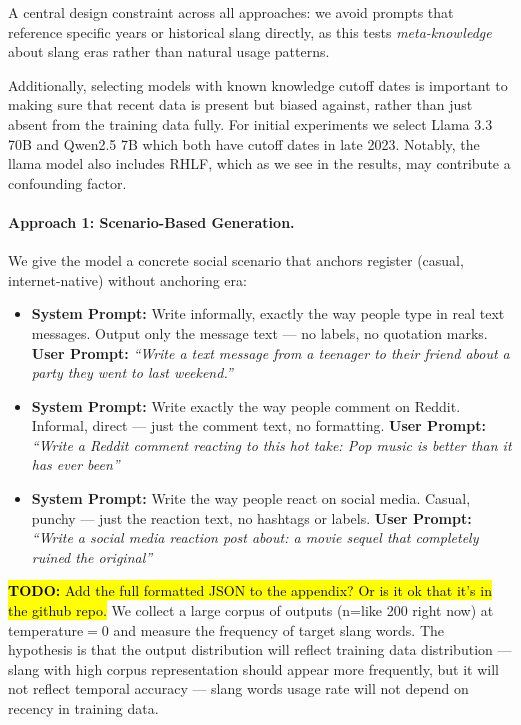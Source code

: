 \documentclass[11pt]{article}
\newcommand{\todo}[1]{\hl{\textbf{TODO:} #1}}
\begin{document}
A central design constraint across all approaches: we avoid prompts that reference specific years or historical slang directly, as this tests \textit{meta-knowledge} about slang eras rather than natural usage patterns.

Additionally, selecting models with known knowledge cutoff dates is important to making sure that recent data is present but biased against, rather than just absent from the training data fully. For initial experiments we select Llama 3.3 70B  
and Qwen2.5 7B which both have cutoff dates in late 2023. Notably, the llama model also includes RHLF, which as we see in the results, may contribute a confounding factor.

\paragraph{Approach 1: Scenario-Based Generation.}
We give the model a concrete social scenario that anchors register (casual, internet-native) without anchoring era:
\begin{itemize}
   \item \textbf{System Prompt:} Write informally, exactly the way people type in real text messages. Output only the message text — no labels, no quotation marks.
  \subitem \textbf{User Prompt:} \textit{``Write a text message from a teenager to their friend about a party they went to last weekend.''}
  \item \textbf{System Prompt:} Write exactly the way people comment on Reddit. Informal, direct — just the comment text, no formatting.
  \subitem \textbf{User Prompt:} \textit{``Write a Reddit comment reacting to this hot take: Pop music is better than it has ever been''}
  \item \textbf{System Prompt:} Write the way people react on social media. Casual, punchy — just the reaction text, no hashtags or labels.
  \subitem \textbf{User Prompt:} \textit{``Write a social media reaction post about: a movie sequel that completely ruined the original''}
\end{itemize}
\todo{Add the full formatted JSON to the appendix? Or is it ok that it's in the github repo.}
We collect a large corpus of outputs (n=like 200 right now) at temperature$=0$ and measure the frequency of target slang words. The hypothesis is that the output distribution will reflect training data distribution --- slang with high corpus representation should appear more frequently, but it will not reflect temporal accuracy --- slang words usage rate will not depend on recency in training data.
\end{document}
